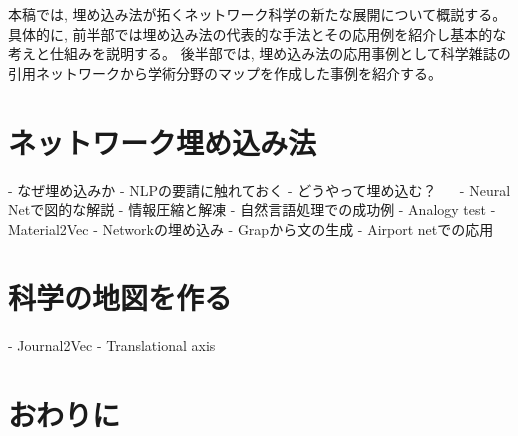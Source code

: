 \documentclass[J]{scitrans}
\begin{document}
本稿では, 埋め込み法が拓くネットワーク科学の新たな展開について概説する。
具体的に, 前半部では埋め込み法の代表的な手法とその応用例を紹介し基本的な考えと仕組みを説明する。
後半部では, 埋め込み法の応用事例として科学雑誌の引用ネットワークから学術分野のマップを作成した事例を紹介する。

\section{ネットワーク埋め込み法}

- なぜ埋め込みか
    - NLPの要請に触れておく
- どうやって埋め込む？
　  - Neural Netで図的な解説
    - 情報圧縮と解凍
- 自然言語処理での成功例
    - Analogy test
    - Material2Vec
- Networkの埋め込み
    - Grapから文の生成
- Airport netでの応用

\section{科学の地図を作る}

- Journal2Vec
- Translational axis




\section{おわりに}


\acknowledgement





\end{document}
